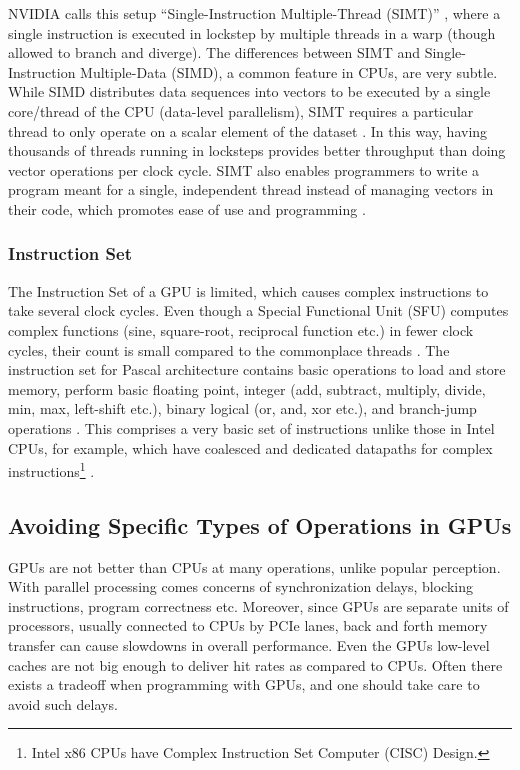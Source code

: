 NVIDIA calls this setup ``Single-Instruction Multiple-Thread (SIMT)'' \cite{CUDADocs} \cite[Appendix~B.4]{PattersonARM}, where a single instruction is executed in lockstep by multiple threads in a warp (though allowed to branch and diverge). The differences between SIMT and Single-Instruction Multiple-Data (SIMD), a common feature in CPUs, are very subtle. While SIMD distributes data sequences into vectors to be executed by a single core/thread of the CPU (data-level parallelism), SIMT requires a particular thread to only operate on a scalar element of the dataset  \cite{PattersonARM}. In this way, having thousands of threads running in locksteps provides better throughput than doing vector operations per clock cycle. SIMT also enables programmers to write a program meant for a single, independent thread instead of managing vectors in their code, which promotes ease of use and programming \cite[Chapter~4]{CUDADocs}.

\subsubsection{Instruction Set}
The Instruction Set of a GPU is limited, which causes complex instructions to take several clock cycles. Even though a Special Functional Unit (SFU) computes complex functions (sine, square-root, reciprocal function etc.) in fewer clock cycles, their count is small compared to the commonplace threads \cite[Appendix~B]{PattersonARM}. The instruction set for Pascal architecture contains basic operations to load and store memory, perform basic floating point, integer (add, subtract, multiply, divide, min, max, left-shift etc.), binary logical (or, and, xor etc.), and branch-jump operations \cite{CUDABinUtils, DemystifyingGPU}. This comprises a very basic set of instructions unlike those in Intel CPUs, for example, which have coalesced and dedicated datapaths for complex instructions\footnote{Intel x86 CPUs have Complex Instruction Set Computer (CISC) Design.} \cite{PattersonARM}.

\subsection{Avoiding Specific Types of Operations in GPUs} \label{sec:Avoiding Specific Operations in GPUs}
GPUs are not better than CPUs at many operations, unlike popular perception. With parallel processing comes concerns of synchronization delays, blocking instructions, program correctness etc. Moreover, since GPUs are separate units of processors, usually connected to CPUs by PCIe lanes, back and forth memory transfer can cause slowdowns in overall performance. Even the GPUs low-level caches are not big enough to deliver hit rates as compared to CPUs. Often there exists a tradeoff when programming with GPUs, and one should take care to avoid such delays.

